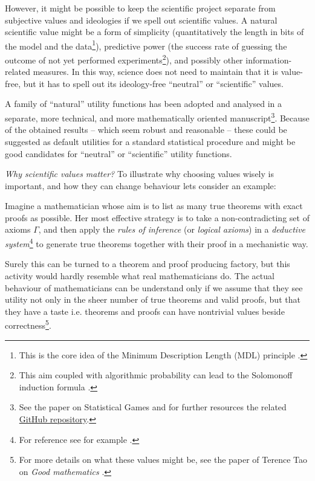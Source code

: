 \documentclass{article}
\begin{document}
However, it might be possible to keep the scientific project separate from subjective values and ideologies if we spell out scientific values. A natural scientific value might be a form of simplicity (quantitatively the length in bits of the model and the data\footnote{This is the core idea of the Minimum Description Length (MDL) principle \cite{paper:MinimumDescriptionLengthRevisited,book:MinimumDescriptionLength}.}), predictive power (the success rate of guessing the outcome of not yet performed experiments\footnote{This aim coupled with algorithmic probability \cite{book:LiVitanyi} can lead to the Solomonoff induction formula \cite{book:Solomonoff,book:UniversalArtificialIntelligence}.}), and possibly other information-related measures. In this way, science does not need to maintain that it is value-free, but it has to spell out its ideology-free ``neutral'' or ``scientific'' values.

A family of ``natural'' utility functions has been adopted and analysed in a separate, more technical, and more mathematically oriented manuscript\footnote{See the paper on Statistical Games \cite{arxiv:konczer2024statisticalgames} and for further resources the related \href{https://github.com/Konczer/UncertaintyTheory/tree/main/StatisticalGames}{GitHub repository}.}. Because of the obtained results – which seem robust and reasonable – these could be suggested as default utilities for a standard statistical procedure and might be good candidates for ``neutral'' or ``scientific'' utility functions.

{\it Why scientific values matter?}
To illustrate why choosing values wisely is important, and how they can change behaviour lets consider an example:

Imagine a mathematician whose aim is to list as many true theorems with exact proofs as possible. Her most effective strategy is to take a non-contradicting set of axioms $\Gamma$, and then apply the \emph{rules of inference} (or \emph{logical axioms}) in a \emph{deductive system}\footnote{For reference see for example \cite{sep:ClassicalLogic,book:MathematicalLogic,book:ComputabilityAndLogic}.} to generate true theorems together with their proof in a mechanistic way. 

Surely this can be turned to a theorem and proof producing factory, but this activity would hardly resemble what real mathematicians do. The actual behaviour of mathematicians can be understand only if we assume that they see utility not only in the sheer number of true theorems and valid proofs, but that they have a taste i.e. theorems and proofs can have nontrivial values beside correctness\footnote{For more details on what these values might be, see the paper of Terence Tao on \emph{Good mathematics} \cite{arxiv:GoodMathematics}.}.
\end{document}
